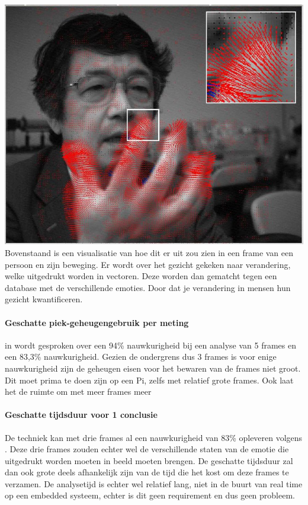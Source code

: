 \documentclass[11pt]{article}
\begin{document}
    \newline
    \includegraphics[height=0.2\textheight]{Images/An-example-of-optical-flow-detection-of-face-and-gesture-Detected-optical-flow-vectors.jpg}
    \newline
    \emph{\citet{Exact_Algebraic_Method_of_Optical_Flow_Detection}}
    \newline
    Bovenstaand is een visualisatie van hoe dit er uit zou zien in een frame van een persoon en zijn beweging.
    Er wordt over het gezicht gekeken naar verandering, welke uitgedrukt worden in vectoren.
    Deze worden dan gematcht tegen een database met de verschillende emoties.
    Door dat je verandering in mensen hun gezicht kwantificeren. 

    \paragraph{Geschatte piek-geheugengebruik per meting}
    in \emph{\citet{barronperformance}} wordt gesproken over een 94\% nauwkurigheid bij een analyse van 5 frames en een 83,3\% nauwkurigheid.
    Gezien de ondergrens dus 3 frames is voor enige nauwkurigheid zijn de geheugen eisen voor het bewaren van de frames niet groot. 
    Dit moet prima te doen zijn op een Pi, zelfs met relatief grote frames. Ook laat het de ruimte om met meer frames meer 

    \paragraph{Geschatte tijdsduur voor 1 conclusie}
    De techniek kan met drie frames al een nauwkurigheid van 83\% opleveren volgens \emph{\citet{naghsh2006efficient}}.
    Deze drie frames zouden echter wel de verschillende staten van de emotie die uitgedrukt worden moeten in beeld moeten brengen.
    De geschatte tijdsduur zal dan ook grote deels afhankelijk zijn van de tijd die het kost om deze frames te verzamen.
    De analysetijd is echter wel relatief lang, niet in de buurt van real time op een embedded systeem, echter is dit geen requirement en dus geen probleem.
\end{document}
